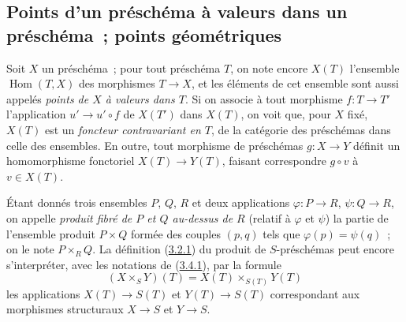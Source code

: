 \subsection{Points d'un préschéma à valeurs dans un préschéma~; points
géométriques}
\label{subsection:I.3.4-fr}

\begin{env}[3.4.1]
\label{I.3.4.1-fr}
Soit $X$ un préschéma~; pour tout préschéma $T$, on note encore $X(T)$
l'ensemble $\operatorname{Hom}(T,X)$ des morphismes $T\to X$, et les éléments de cet ensemble
sont aussi appelés \emph{points de $X$ à valeurs dans $T$}. Si on associe à
tout morphisme $f:T\to T'$ l'application $u'\to u'\circ f$ de $X(T')$ dans
$X(T)$, on voit que, pour $X$ fixé, $X(T)$ est un \emph{foncteur contravariant
en $T$}, de la catégorie des préschémas dans celle des ensembles. En outre,
tout morphisme de préschémas $g:X\to Y$ définit un homomorphisme fonctoriel
$X(T)\to Y(T)$, faisant correspondre $g\circ v$ à $v\in X(T)$.
\end{env}

\begin{env}[3.4.2]
\label{I.3.4.2-fr}
Étant donnés trois ensembles $P$, $Q$, $R$ et deux applications
$\varphi:P\to R$, $\psi:Q\to R$, on appelle \emph{produit fibré de $P$ et $Q$
au-dessus de $R$} (relatif à $\varphi$ et $\psi$) la partie de
l'ensemble produit $P\times Q$ formée des couples $(p,q)$ tels que
$\varphi(p)=\psi(q)$~; on le note $P\times_R Q$. La définition
(\hyperref[I.3.2.1-fr]{3.2.1}) du produit de $S$-préschémas peut encore
s'interpréter, avec les notations de (\hyperref[I.3.4.1-fr]{3.4.1}), par la
formule
\label{I.3.4.2.1-fr}
\[
  (X\times_S Y)(T)=X(T)\times_{S(T)}Y(T)
  \tag{3.4.2.1}
\]
les applications $X(T)\to S(T)$ et $Y(T)\to S(T)$ correspondant aux morphismes
structuraux $X\to S$ et $Y\to S$.
\end{env}


